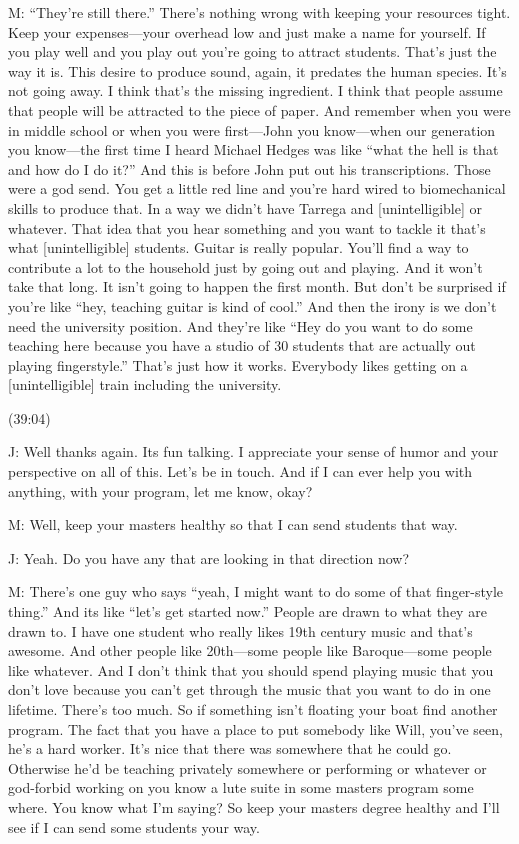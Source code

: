 \documentclass[11pt]{article}
\begin{document}
M: ``They're still there.'' There's nothing wrong with keeping your resources tight. Keep your expenses—your overhead low and just make a name for yourself. If you play well and you play out you're going to attract students. That's just the way it is. This desire to produce sound, again, it predates the human species. It's not going away. I think that's the missing ingredient. I think that people assume that people will be attracted to the piece of paper. And remember when you were in middle school or when you were first—John you know—when our generation you know—the first time I heard Michael Hedges was like ``what the hell is that and how do I do it?'' And this is before John put out his transcriptions. Those were a god send. You get a little red line and you're hard wired to biomechanical skills to produce that. In a way we didn't have Tarrega and [unintelligible] or whatever. That idea that you hear something and you want to tackle it that's what [unintelligible] students. Guitar is really popular. You'll find a way to contribute a lot to the household just by going out and playing. And it won't take that long. It isn't going to happen the first month. But don't be surprised if you're like ``hey, teaching guitar is kind of cool.'' And then the irony is we don't need the university position. And they're like ``Hey do you want to do some teaching here because you have a studio of 30 students that are actually out playing fingerstyle.'' That's just how it works. Everybody likes getting on a [unintelligible] train including the university. 

(39:04)

J: Well thanks again. Its fun talking. I appreciate your sense of humor and your perspective on all of this. Let's be in touch. And if I can ever help you with anything, with your program, let me know, okay? 

M: Well, keep your masters healthy so that I can send students that way. 

J: Yeah. Do you have any that are looking in that direction now? 

M: There's one guy who says ``yeah, I might want to do some of that finger-style thing.'' And its like ``let's get started now.'' People are drawn to what they are drawn to. I have one student who really likes 19th century music and that's awesome. And other people like 20th—some people like Baroque—some people like whatever. And I don't think that you should spend playing music that you don't love because you can't get through the music that you want to do in one lifetime. There's too much. So if something isn't floating your boat find another program. The fact that you have a place to put somebody like Will, you've seen, he's a hard worker. It's nice that there was somewhere that he could go. Otherwise he'd be teaching privately somewhere or performing or whatever or god-forbid working on you know a lute suite in some masters program some where. You know what I'm saying? So keep your masters degree healthy and I'll see if I can send some students your way.
\end{document}
